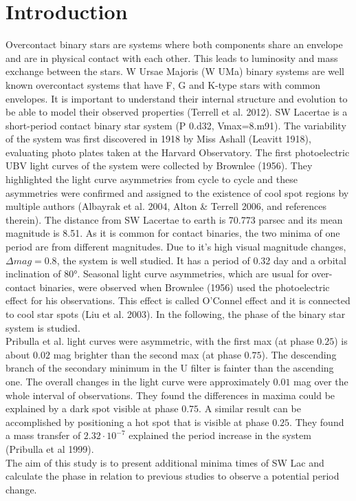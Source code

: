 \section{Introduction}
\label{sec:Theorie}

Overcontact binary stars are systems where both components share an envelope and 
are in physical contact with each other. This leads to luminosity and mass exchange 
between the stars. W Ursae Majoris (W UMa) binary systems are well known overcontact 
systems that have F, G and K-type stars with common envelopes. It is important to 
understand their internal structure and evolution to be able to model their observed 
properties (Terrell et al. 2012). SW Lacertae is a short-period contact binary star 
system (P 0.d32, Vmax=8.m91). The variability of the system was first discovered in 
1918 by Miss Ashall (Leavitt 1918), evaluating photo plates taken at the Harvard Observatory. 
The first photoelectric 
UBV light curves of the system were collected by Brownlee (1956). They highlighted the 
light curve asymmetries from cycle to cycle and these asymmetries were confirmed and 
assigned to the existence of cool spot regions by multiple authors (Albayrak et al. 
2004, Alton \& Terrell 2006, and references therein). The distance from SW Lacertae to 
earth is 70.773 parsec and its mean magnitude is 8.51. As it is common for contact 
binaries, the two minima of one period are from different magnitudes. Due to it’s 
high visual magnitude changes, $\Delta mag = 0.8$, the system is well studied. It has a 
period of 0.32 day and a orbital inclination of 80°. Seasonal light curve asymmetries,
 which are usual for over-contact binaries, were observed when Brownlee (1956) used the
  photoelectric effect for his observations. This effect is called O’Connel effect and 
  it is connected to cool star spots (Liu et al. 2003). 
In the following, the phase of the binary star system is studied.   \\
\noindent Pribulla et al. light curves were asymmetric, with the first max (at phase $0.25$) is about 
$0.02$ mag brighter than the second max (at phase $0.75$). The descending branch of the 
secondary minimum in the U filter is fainter than the ascending one. The overall changes 
in the light curve were approximately $0.01$ mag over the whole interval of observations. 
They found the differences in maxima could be explained by a dark spot visible at phase $0.75$.
 A similar result can be accomplished by positioning a hot spot that is visible at phase $0.25$.
  They found a mass transfer of $2.32 \cdot 10^{-7}$ explained the period increase in the system 
  (Pribulla et al 1999).\\

\noindent The aim of this study is to present additional minima times of SW Lac and calculate the phase in 
relation to previous studies to observe a potential period change. 
